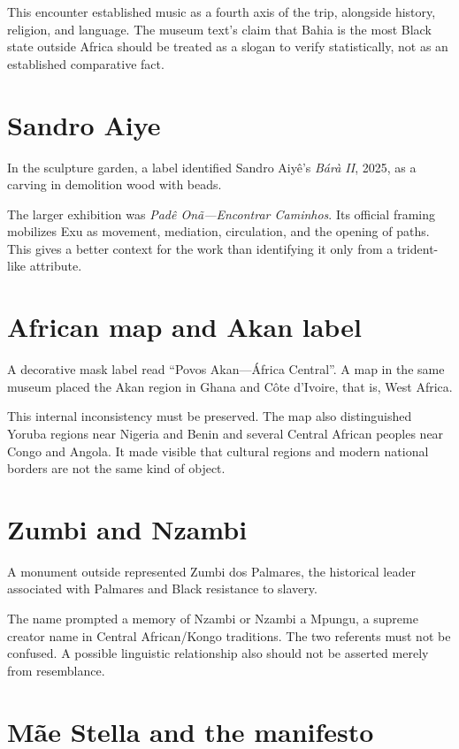 This encounter established music as a
fourth axis of the trip, alongside history,
religion, and language.  The museum text's
claim that Bahia is the most Black state
outside Africa should be treated as a
slogan to verify statistically, not as an
established comparative fact.

\section{Sandro Aiye}

In the sculpture garden, a label identified
Sandro Aiy\^e's \emph{B\'ar\`a II}, 2025,
as a carving in demolition wood with
beads.

The larger exhibition was
\emph{Pad\^e On\~a---Encontrar Caminhos}.
Its official framing mobilizes Exu as
movement, mediation, circulation, and the
opening of paths.  This gives a better
context for the work than identifying it
only from a trident-like attribute.

\section{African map and Akan label}

A decorative mask label read
``Povos Akan---\'Africa Central''.  A map in
the same museum placed the Akan region in
Ghana and C\^ote d'Ivoire, that is, West
Africa.

This internal inconsistency must be
preserved.  The map also distinguished
Yoruba regions near Nigeria and Benin and
several Central African peoples near Congo
and Angola.  It made visible that cultural
regions and modern national borders are
not the same kind of object.

\section{Zumbi and Nzambi}

A monument outside represented Zumbi dos
Palmares, the historical leader associated
with Palmares and Black resistance to
slavery.

The name prompted a memory of Nzambi or
Nzambi a Mpungu, a supreme creator name in
Central African/Kongo traditions.  The two
referents must not be confused.  A possible
linguistic relationship also should not be
asserted merely from resemblance.

\section{Mãe Stella and the manifesto}

